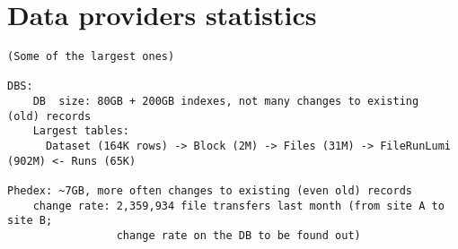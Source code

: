 \appendix
\section{Data providers statistics}
\begin{verbatim}
(Some of the largest ones)

DBS:
    DB  size: 80GB + 200GB indexes, not many changes to existing  (old) records
    Largest tables: 
      Dataset (164K rows) -> Block (2M) -> Files (31M) -> FileRunLumi (902M) <- Runs (65K)

Phedex: ~7GB, more often changes to existing (even old) records
    change rate: 2,359,934 file transfers last month (from site A to site B; 
                 change rate on the DB to be found out)
\end{verbatim}